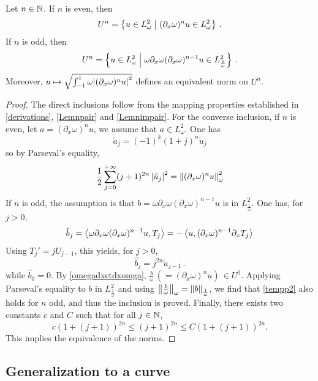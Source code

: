 \documentclass[a4paper]{article}
\begin{document}
\begin{Lem} 
	\label{LemEquivalentNormsUn}
	Let $n \in \mathbb{N}$. If $n$ is even, then
	\[U^n = \left\{u \in L^2_\omega\mathrel{}\middle|\mathrel{}(\partial_x \omega)^n u \in L^2_\omega\right\}\,.\]
	If $n$ is odd, then
	\[U^n = \left\{u \in L^2_\omega\mathrel{}\middle|\mathrel{}\omega \partial_x\omega (\partial_x \omega)^{n-1} u \in L^2_\frac{1}{\omega}\right\}\,.\]	
	Moreover, $u \mapsto \sqrt{\int_{-1}^{1} \omega {\left\lvert ( \partial_x \omega )^nu \right\rvert^2}}$ defines an equivalent norm on $U^n$. 
\end{Lem}
\begin{proof}
	The direct inclusions follow from the mapping properties established in \autoref{derivations}, \autoref{Lemnpair} and \autoref{Lemnimpair}. For the converse inclusion, if $n$ is even, let $a = (\partial_x \omega)^n u$, we assume that $a \in L^2_\omega$. One has 
	\[\check{a}_j = (-1)^k \left(1+j\right)^{n}\check{u}_j\] 
	so by Parseval's equality, 
	\begin{equation}
		\label{tempp2}
		\frac{1}{2}\sum_{j = 0 }^{+ \infty} (j+1)^{2n} \left\lvert \check{u}_j \right\rvert^2 = \left\|(\partial_x \omega)^nu\right\|^2_\omega
	\end{equation}
	If $n$ is odd, the assumption is that $b = \omega \partial_x \omega(\partial_x \omega)^{n-1}u$ is in $L^2_\frac{1}{\omega}$. One has, for $j > 0$, 
	\[\hat{b}_j = \left\langle \omega \partial_x \omega(\partial_x \omega)^{n-1}u,T_j\right\rangle = -\left\langle u,(\partial_x \omega)^{n-1} \partial_x T_j\right\rangle\]
	Using $T_j' = jU_{j-1}$, this yields, for $j > 0$,
	\[\hat{b}_j = j^{2n} \check{u}_{j-1}\,.\]
	while $\hat{b}_0 = 0$. By \autoref{omegadxetdxomga}, $\frac{b}{\omega} \,(= (\partial_x \omega)^n u)\, \in U^0$. Applying Parseval's equality to $b$ in $L^2_\frac{1}{\omega}$ and using $\left\|\frac{b}{\omega}\right\|_\omega = \left\|b\right\|_\frac{1}{\omega}$, we find that \eqref{tempp2} also holds for $n$ odd, and thus the inclusion is proved. Finally, there exists two constants $c$ and $C$ such that for all $j \in \mathbb{N}$, 
	\[c(1 + (j + 1))^{2n} \leq (j + 1)^{2n}  \leq C(1 + (j+1))^{2n}.\]
	This implies the equivalence of the norms.
	\end{proof}
	
\subsection{Generalization to a curve}

\label{TsUs(Gamma)}
\end{document}
